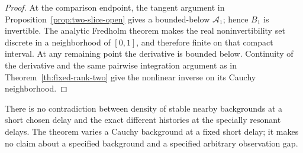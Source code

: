 \begin{proof}
At the comparison endpoint, the tangent argument in
Proposition~\ref{prop:two-slice-open} gives a
bounded-below $\mathcal A_1$; hence $B_1$ is invertible.
The analytic Fredholm theorem makes the real
noninvertibility set discrete in a neighborhood of
$[0,1]$, and therefore finite on that compact interval.
At any remaining point the derivative is bounded below.
Continuity of the derivative and the same pairwise
integration argument as in
Theorem~\ref{th:fixed-rank-two} give the nonlinear
inverse on its Cauchy neighborhood.
\end{proof}

There is no contradiction between density of stable
nearby backgrounds at a short chosen delay and the exact
different histories at the specially resonant delays.
The theorem varies a Cauchy background at a fixed short
delay; it makes no claim about a specified background
and a specified arbitrary observation gap.
